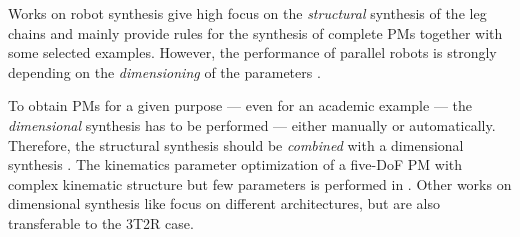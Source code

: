 \documentclass[
	graybox,
	vecphys] %
	{svmult}
\begin{document}
%
Works on robot synthesis give high focus on the \emph{structural} synthesis of the leg chains and mainly provide rules for the synthesis of complete PMs together with some selected examples.
However, the performance of parallel robots is strongly depending on the \emph{dimensioning} of the parameters \cite{Merlet2006}.

To obtain PMs for a given purpose --- even for an academic example --- the \emph{dimensional} synthesis has to be performed --- either manually or automatically.
Therefore, the structural synthesis should be \emph{combined} with a dimensional synthesis \cite{FrindtKreHes2010}.
The kinematics parameter optimization of a five-DoF PM with complex kinematic structure but few parameters is performed in  \cite{SongLiaSunDon2014}.
Other works on dimensional synthesis like \cite{FrindtKreHes2010} focus on different architectures, but are also transferable to the 3T2R case. %



\end{document}
